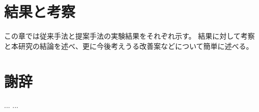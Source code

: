 \documentclass[a4paper,11pt,oneside,openany, report]{jsbook}
\begin{document}
\chapter{結果と考察}
この章では従来手法と提案手法の実験結果をそれぞれ示す。
結果に対して考察と本研究の結論を述べ、更に今後考えうる改善案などについて簡単に述べる。

%
%
\appendix
%

%
%
\chapter*{謝辞}
...
...





%

% 


%
% 
%
%
\newpage
\printindex
%
%
\end{document}
